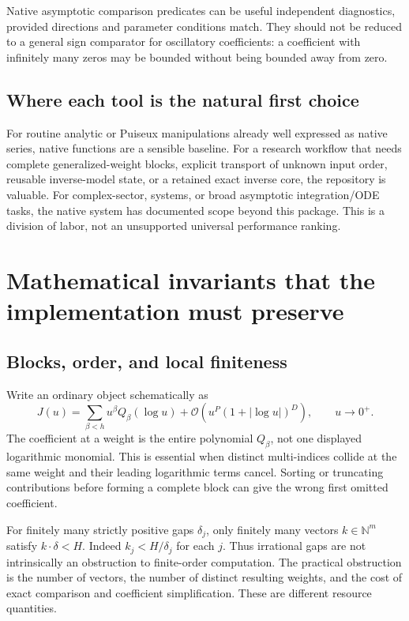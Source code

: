 \documentclass[11pt,a4paper]{article}
\newcommand{\OO}{\mathcal O}
\newcommand{\N}{\mathbb N}
\begin{document}
Native asymptotic comparison predicates can be useful independent diagnostics, provided directions and parameter conditions match. They should not be reduced to a general sign comparator for oscillatory coefficients: a coefficient with infinitely many zeros may be bounded without being bounded away from zero.\cite{wl-less,wl-equivalent}

\subsection{Where each tool is the natural first choice}

For routine analytic or Puiseux manipulations already well expressed as native series, native functions are a sensible baseline. For a research workflow that needs complete generalized-weight blocks, explicit transport of unknown input order, reusable inverse-model state, or a retained exact inverse core, the repository is valuable. For complex-sector, systems, or broad asymptotic integration/ODE tasks, the native system has documented scope beyond this package. This is a division of labor, not an unsupported universal performance ranking.

\section{Mathematical invariants that the implementation must preserve}\label{sec:invariants}

\subsection{Blocks, order, and local finiteness}

Write an ordinary object schematically as
\begin{equation}\label{eq:jet}
 J(u)=\sum_{\beta<h}u^\beta Q_\beta(\log u)
       +\OO\!\left(u^P(1+|\log u|)^D\right),\qquad u\to0^+.
\end{equation}
The coefficient at a weight is the entire polynomial $Q_\beta$, not one displayed logarithmic monomial. This is essential when distinct multi-indices collide at the same weight and their leading logarithmic terms cancel. Sorting or truncating contributions before forming a complete block can give the wrong first omitted coefficient.

For finitely many strictly positive gaps $\delta_j$, only finitely many vectors $k\in\N^m$ satisfy $k\cdot\delta<H$. Indeed $k_j<H/\delta_j$ for each $j$. Thus irrational gaps are not intrinsically an obstruction to finite-order computation. The practical obstruction is the number of vectors, the number of distinct resulting weights, and the cost of exact comparison and coefficient simplification. These are different resource quantities.
\end{document}
